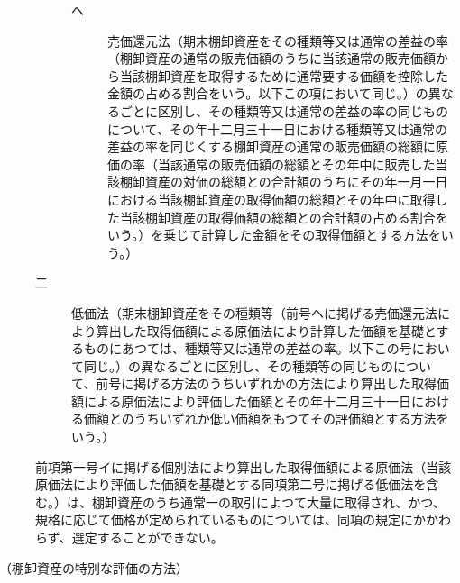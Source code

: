 \documentclass[twocolumn,a4j,10pt]{ltjtarticle}
\begin{document}
\begin{description}
\begin{description}
\begin{description}
\item[ヘ]売価還元法（期末棚卸資産をその種類等又は通常の差益の率（棚卸資産の通常の販売価額のうちに当該通常の販売価額から当該棚卸資産を取得するために通常要する価額を控除した金額の占める割合をいう。以下この項において同じ。）の異なるごとに区別し、その種類等又は通常の差益の率の同じものについて、その年十二月三十一日における種類等又は通常の差益の率を同じくする棚卸資産の通常の販売価額の総額に原価の率（当該通常の販売価額の総額とその年中に販売した当該棚卸資産の対価の総額との合計額のうちにその年一月一日における当該棚卸資産の取得価額の総額とその年中に取得した当該棚卸資産の取得価額の総額との合計額の占める割合をいう。）を乗じて計算した金額をその取得価額とする方法をいう。）
\end{description}
\item[二]低価法（期末棚卸資産をその種類等（前号ヘに掲げる売価還元法により算出した取得価額による原価法により計算した価額を基礎とするものにあつては、種類等又は通常の差益の率。以下この号において同じ。）の異なるごとに区別し、その種類等の同じものについて、前号に掲げる方法のうちいずれかの方法により算出した取得価額による原価法により評価した価額とその年十二月三十一日における価額とのうちいずれか低い価額をもつてその評価額とする方法をいう。）
\end{description}
\item[\rensuji{2}]前項第一号イに掲げる個別法により算出した取得価額による原価法（当該原価法により評価した価額を基礎とする同項第二号に掲げる低価法を含む。）は、棚卸資産のうち通常一の取引によつて大量に取得され、かつ、規格に応じて価格が定められているものについては、同項の規定にかかわらず、選定することができない。
\end{description}
\noindent\hspace{10pt}（棚卸資産の特別な評価の方法）
\end{document}
